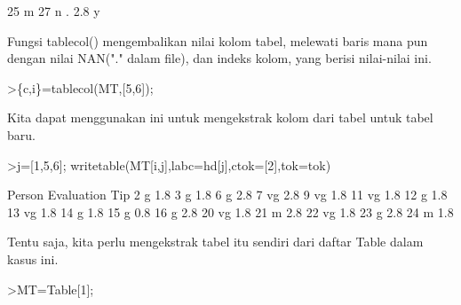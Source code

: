 \documentclass[a4paper,10pt]{article}
\begin{document}
\begin{eulernotebook}
\begin{eulercomment}
\begin{eulercomment}
\begin{eulercomment}
\begin{eulercomment}
\begin{eulercomment}
\begin{eulercomment}
\begin{eulercomment}
\begin{eulercomment}
\begin{eulercomment}
\begin{eulercomment}
\begin{eulercomment}
\begin{eulercomment}
\begin{eulercomment}
\begin{eulercomment}
\begin{eulercomment}
\begin{eulercomment}
\begin{eulercomment}
\begin{eulercomment}
\begin{eulercomment}
\begin{eulercomment}
\begin{eulercomment}
\begin{eulercomment}
\begin{eulercomment}
\begin{eulercomment}
\begin{eulercomment}
\begin{eulercomment}
\begin{eulercomment}
\begin{eulercomment}
\begin{eulercomment}
\begin{eulercomment}
\begin{eulercomment}
\begin{eulercomment}
\begin{euleroutput}
       25    m   27       n          .  2.8       y
\end{euleroutput}
\begin{eulercomment}
Fungsi tablecol() mengembalikan nilai kolom tabel, melewati baris mana
pun dengan nilai NAN("." dalam file), dan indeks kolom, yang berisi
nilai-nilai ini.
\end{eulercomment}
\begin{eulerprompt}
>\{c,i\}=tablecol(MT,[5,6]);
\end{eulerprompt}
\begin{eulercomment}
Kita dapat menggunakan ini untuk mengekstrak kolom dari tabel untuk
tabel baru.
\end{eulercomment}
\begin{eulerprompt}
>j=[1,5,6]; writetable(MT[i,j],labc=hd[j],ctok=[2],tok=tok)
\end{eulerprompt}
\begin{euleroutput}
      Person Evaluation       Tip
           2          g       1.8
           3          g       1.8
           6          g       2.8
           7         vg       2.8
           9         vg       1.8
          11         vg       1.8
          12          g       1.8
          13         vg       1.8
          14          g       1.8
          15          g       0.8
          16          g       2.8
          20         vg       1.8
          21          m       2.8
          22         vg       1.8
          23          g       2.8
          24          m       1.8
\end{euleroutput}
\begin{eulercomment}
Tentu saja, kita perlu mengekstrak tabel itu sendiri dari daftar Table
dalam kasus ini.
\end{eulercomment}
\begin{eulerprompt}
>MT=Table[1];
\end{eulerprompt}
\begin{eulercomment}

\end{eulercomment}
\end{eulercomment}
\end{eulercomment}
\end{eulercomment}
\end{eulercomment}
\end{eulercomment}
\end{eulercomment}
\end{eulercomment}
\end{eulercomment}
\end{eulercomment}
\end{eulercomment}
\end{eulercomment}
\end{eulercomment}
\end{eulercomment}
\end{eulercomment}
\end{eulercomment}
\end{eulercomment}
\end{eulercomment}
\end{eulercomment}
\end{eulercomment}
\end{eulercomment}
\end{eulercomment}
\end{eulercomment}
\end{eulercomment}
\end{eulercomment}
\end{eulercomment}
\end{eulercomment}
\end{eulercomment}
\end{eulercomment}
\end{eulercomment}
\end{eulercomment}
\end{eulercomment}
\end{eulercomment}
\end{eulernotebook}
\end{document}
